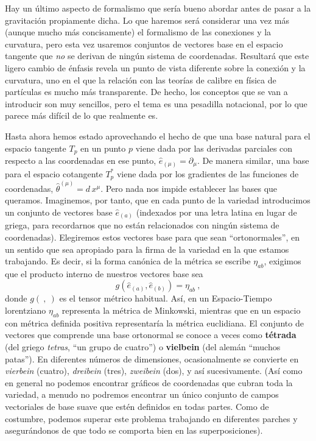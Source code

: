 \documentclass[11pt,b5paper,openany,twoside]{book}
\newcommand{\e}[1]{\hat{e}_{(#1)}}
\newcommand{\ztheta}[1]{{\hat{\theta}}^{(#1)}}
\newcommand{\p}[1]{{\partial_{#1}}}
\begin{document}
Hay un último aspecto de formalismo que sería bueno abordar antes de pasar a la gravitación propiamente dicha.
Lo que haremos será considerar una vez más (aunque mucho más concisamente) el formalismo de las conexiones y la curvatura, pero esta vez usaremos conjuntos de vectores base en el espacio tangente que \textit{no} se derivan de ningún sistema de coordenadas.
Resultará que este ligero cambio de énfasis revela un punto de vista diferente sobre la conexión y la curvatura, uno en el que la relación con las teorías de calibre en física de partículas es mucho más transparente.
De hecho, los conceptos que se van a introducir son muy sencillos, pero el tema es una pesadilla notacional, por lo que parece más difícil de lo que realmente es.

Hasta ahora hemos estado aprovechando el hecho de que una base natural para el espacio tangente $T_p$ en un punto $p$ viene dada por las derivadas parciales con respecto a las coordenadas en ese punto, $\e\mu = \p\mu$.
De manera similar, una base para el espacio cotangente $T^*_p$ viene dada por los gradientes de las funciones de coordenadas, $ \ztheta{\mu} =  d\,x^\mu$.
Pero nada nos impide establecer las bases que queramos.
Imaginemos, por tanto, que en cada punto de la variedad introducimos un conjunto de vectores base $\e{a}$ (indexados por una letra latina en lugar de griega, para recordarnos que no están relacionados con ningún sistema de coordenadas).
Elegiremos estos vectores base para que sean ``ortonormales'', en un sentido que sea apropiado para la firma de la variedad en la que estamos trabajando.
Es decir, si la forma canónica de la métrica se escribe $\eta_{ab}$, exigimos que el producto interno de nuestros vectores base sea
\begin{equation}
g(\e{a},\e{b}) = \eta_{ab}\ ,\label{3.114}
\end{equation}
donde $g(~,~)$ es el tensor métrico habitual.
Así, en un Espacio-Tiempo lorentziano $\eta_{ab}$ representa la métrica de Minkowski, mientras que en un espacio con métrica definida positiva representaría la métrica euclidiana.
El conjunto de vectores que comprende una base ortonormal se conoce a veces como {\bf tétrada} (del griego {\it tetras}, ``un grupo de cuatro'') o {\bf vielbein} (del alemán ``muchos patas'').
En diferentes números de dimensiones, ocasionalmente se convierte en {\it vierbein} (cuatro), {\it dreibein} (tres), {\it zweibein} (dos), y así sucesivamente.
(Así como en general no podemos encontrar gráficos de coordenadas que cubran toda la variedad, a menudo no podremos encontrar un único conjunto de campos vectoriales de base suave que estén definidos en todas partes.
Como de costumbre, podemos superar este problema trabajando en diferentes parches y asegurándonos de que todo se comporta bien en las superposiciones).
\end{document}
